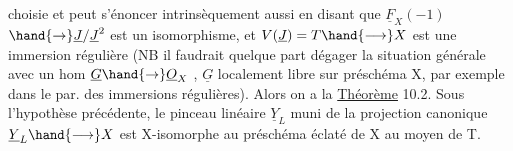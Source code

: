 choisie et peut s'énoncer intrinsèquement aussi en disant que
$\underline{F}_{X}(-1)$$\hand{\to} \underline{J}/\underline{J}^{2}$  est un isomorphisme, et  $V(\underline{J})=T \hand{\longrightarrow} X$  est  une immersion
 régulière  (NB il  faudrait quelque part dégager la situation
générale avec un hom  $\underline{G} \hand{\to} \underline{O}_{X}$ , $\underline{G}$ localement libre sur préschéma X, par
exemple dans le par. des immersions régulières).  Alors on a la
 \uline{Théorème}  10.2.   Sous l'hypothèse précédente, le pinceau
linéaire $\underline{Y}_{L}$  muni de la projection canonique $\underline{Y}_{L} \hand{\longrightarrow} X$  est  X-isomorphe
 au préschéma éclaté  de X au moyen de T.


